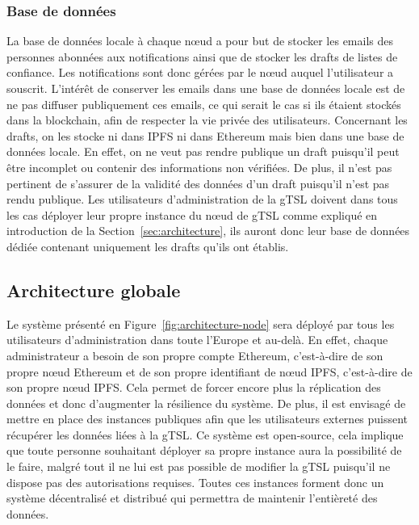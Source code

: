 \documentclass{tnreport}
\begin{document}
\subsubsection{Base de données}

La base de données locale à chaque nœud a pour but de stocker les emails des personnes abonnées aux notifications ainsi que de stocker les drafts de listes de confiance. Les notifications sont donc gérées par le nœud auquel l'utilisateur a souscrit. L'intérêt de conserver les emails dans une base de données locale est de ne pas diffuser publiquement ces emails, ce qui serait le cas si ils étaient stockés dans la blockchain, afin de respecter la vie privée des utilisateurs. Concernant les drafts, on les stocke ni dans IPFS ni dans Ethereum mais bien dans une base de données locale. En effet, on ne veut pas rendre publique un draft puisqu'il peut être incomplet ou contenir des informations non vérifiées. De plus, il n'est pas pertinent de s'assurer de la validité des données d'un draft puisqu'il n'est pas rendu publique. Les utilisateurs d'administration de la gTSL doivent dans tous les cas déployer leur propre instance du nœud de gTSL comme expliqué en introduction de la Section~\ref{sec:architecture}, ils auront donc leur base de données dédiée contenant uniquement les drafts qu'ils ont établis.

\subsection{Architecture globale}

Le système présenté en Figure~\ref{fig:architecture-node} sera déployé par tous les utilisateurs d'administration dans toute l'Europe et au-delà. En effet, chaque administrateur a besoin de son propre compte Ethereum, c'est-à-dire de son propre nœud Ethereum et de son propre identifiant de nœud IPFS, c'est-à-dire de son propre nœud IPFS. Cela permet de forcer encore plus la réplication des données et donc d'augmenter la résilience du système. De plus, il est envisagé de mettre en place des instances publiques afin que les utilisateurs externes puissent récupérer les données liées à la gTSL. Ce système est open-source, cela implique que toute personne souhaitant déployer sa propre instance aura la possibilité de le faire, malgré tout il ne lui est pas possible de modifier la gTSL puisqu'il ne dispose pas des autorisations requises. Toutes ces instances forment donc un système décentralisé et distribué qui permettra de maintenir l'entièreté des données. 
\end{document}

